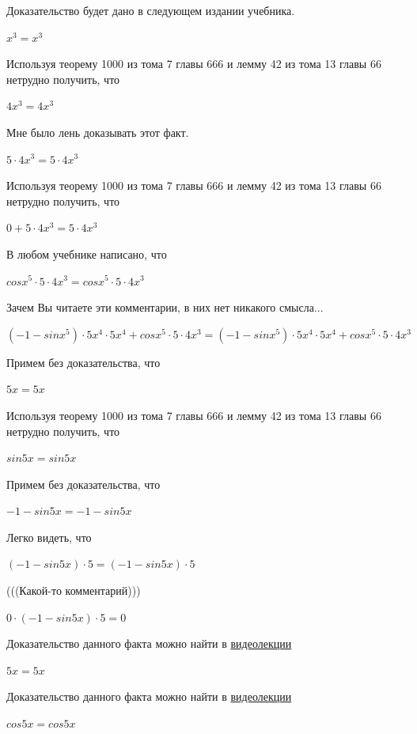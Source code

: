 \documentclass[12pt,a4paper,fleqn]{article}
\theoremstyle{definition}
\begin{document}
Доказательство будет дано в следующем издании учебника. 

${ x }^{ 3 } = { x }^{ 3 }$

Используя теорему 1000 из тома 7 главы 666 и лемму 42 из тома 13 главы 66 нетрудно получить, что 

$ 4 { x }^{ 3 } =  4 { x }^{ 3 }$

Мне было лень доказывать этот факт.

$ 5  \cdot  4 { x }^{ 3 } =  5  \cdot  4 { x }^{ 3 }$

Используя теорему 1000 из тома 7 главы 666 и лемму 42 из тома 13 главы 66 нетрудно получить, что 

$ 0  +  5  \cdot  4 { x }^{ 3 } =  5  \cdot  4 { x }^{ 3 }$

В любом учебнике написано, что 

$cos{ x }^{ 5 } \cdot  5  \cdot  4 { x }^{ 3 } = cos{ x }^{ 5 } \cdot  5  \cdot  4 { x }^{ 3 }$

Зачем Вы читаете эти комментарии, в них нет никакого смысла... 

$( -1  - sin{ x }^{ 5 }) \cdot  5 { x }^{ 4 } \cdot  5 { x }^{ 4 } + cos{ x }^{ 5 } \cdot  5  \cdot  4 { x }^{ 3 } = ( -1  - sin{ x }^{ 5 }) \cdot  5 { x }^{ 4 } \cdot  5 { x }^{ 4 } + cos{ x }^{ 5 } \cdot  5  \cdot  4 { x }^{ 3 }$

Примем без доказательства, что 

$ 5  x  =  5  x $

Используя теорему 1000 из тома 7 главы 666 и лемму 42 из тома 13 главы 66 нетрудно получить, что 

$sin 5  x  = sin 5  x $

Примем без доказательства, что 

$ -1  - sin 5  x  =  -1  - sin 5  x $

Легко видеть, что 

$( -1  - sin 5  x ) \cdot  5  = ( -1  - sin 5  x ) \cdot  5 $

(((Какой-то комментарий))) 

$ 0  \cdot ( -1  - sin 5  x ) \cdot  5  =  0 $

Доказательство данного факта можно найти в \href{https://www.youtube.com/watch?v=dQw4w9WgXcQ}{видеолекции} 

$ 5  x  =  5  x $

Доказательство данного факта можно найти в \href{https://www.youtube.com/watch?v=dQw4w9WgXcQ}{видеолекции} 

$cos 5  x  = cos 5  x $
\end{document}

